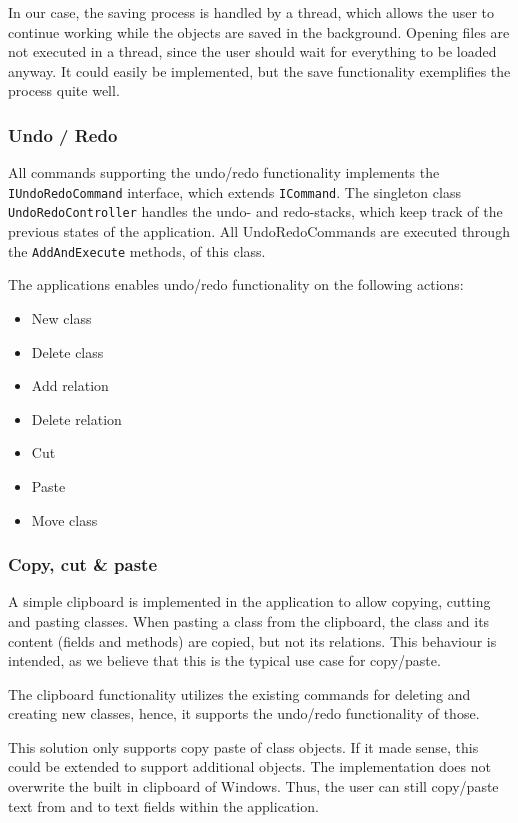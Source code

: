 In our case, the saving process is handled by a thread, which allows the user to
continue working while the objects are saved in the background. Opening files
are not executed in a thread, since the user should wait for everything to be
loaded anyway. It could easily be implemented, but the save functionality
exemplifies the process quite well.


\subsubsection{Undo / Redo}
All commands supporting the undo/redo functionality implements the
\texttt{IUndoRedoCommand} interface, which extends \texttt{ICommand}. The singleton class
\texttt{UndoRedoController} handles the undo- and redo-stacks, which keep track of the
previous states of the application. All UndoRedoCommands are executed through
the \texttt{AddAndExecute} methods, of this class.

The applications enables undo/redo functionality on the following actions:


\begin{itemize}
	\item New class
	\item Delete class
	\item Add relation
	\item Delete relation
	\item Cut
	\item Paste
	\item Move class
\end{itemize}


\subsubsection{Copy, cut \& paste}

A simple clipboard is implemented in the
application to allow copying, cutting and pasting classes. When pasting a class
from the clipboard, the class and its content (fields and methods) are copied,
but not its relations. This behaviour is intended, as we believe that this is
the typical use case for copy/paste.

The clipboard functionality utilizes the existing commands for deleting and
creating new classes, hence, it supports the undo/redo functionality of
those.

This solution only supports copy paste of class objects. If it made sense, this 
could be extended to support additional objects. The implementation does not 
overwrite the built in clipboard of Windows. Thus, the user can still 
copy/paste text from and to text fields within the application.

